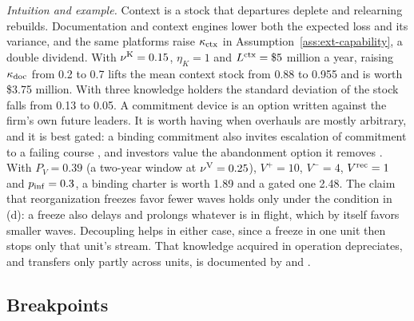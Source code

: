 \noindent\emph{Intuition and example.} Context is a stock that departures deplete and relearning rebuilds. Documentation and context engines lower both the expected loss and its variance, and the same platforms raise $\kappa_{\rm ctx}$ in Assumption~\ref{ass:ext-capability}, a double dividend. With $\nu^{\rm K}=0.15$, $\eta_K=1$ and $L^{\rm ctx}=\$5$ million a year, raising $\kappa_{\rm doc}$ from 0.2 to 0.7 lifts the mean context stock from 0.88 to 0.955 and is worth \$3.75 million. With three knowledge holders the standard deviation of the stock falls from 0.13 to 0.05. A commitment device is an option written against the firm's own future leaders. It is worth having when overhauls are mostly arbitrary, and it is best gated: a binding commitment also invites escalation of commitment to a failing course \citep{staw1976knee,staw1981escalation}, and investors value the abandonment option it removes \citep{berger1996investor,trigeorgis1996real}. With $P_V=0.39$ (a two-year window at $\nu^{\rm V}=0.25$), $V^+=10$, $V^-=4$, $V^{\rm rec}=1$ and $p_{\rm inf}=0.3$, a binding charter is worth 1.89 and a gated one 2.48. The claim that reorganization freezes favor fewer waves holds only under the condition in (d): a freeze also delays and prolongs whatever is in flight, which by itself favors smaller waves. Decoupling helps in either case, since a freeze in one unit then stops only that unit's stream. That knowledge acquired in operation depreciates, and transfers only partly across units, is documented by \citet{argote1990persistence} and \citet{darr1995acquisition}.

\subsection{Breakpoints}\label{sec:ext-breaks}

